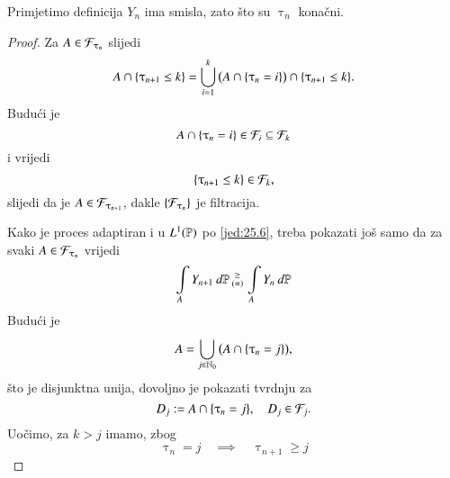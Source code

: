 \begin{nap} \label{nap:25.5-1}
    Primjetimo definicija $Y_n$ ima smisla, zato \v sto su $\uptau_n$ kona\v cni.
\end{nap}

\begin{proof}
    Za $A \in \mathcal{F}_{\uptau_n}$ slijedi
    \begin{equation*}
        A \cap \{ \uptau_{n + 1 } \leq k \} = \bigcup\limits_{i = 1}^{k} \big( A \cap \{ \uptau_n = i \} \big) \cap \{ \uptau_{n + 1} \leq k\}.
    \end{equation*}
    Budu\' ci je
    \begin{equation*}
        A \cap \{ \uptau_n = i \} \in \mathcal{F}_i \subseteq \mathcal{F}_k
    \end{equation*}
    i vrijedi
    \begin{equation*}
        \{ \uptau_{n + 1} \leq k \} \in \mathcal{F}_k,
    \end{equation*}
    slijedi da je $A \in \mathcal{F}_{\uptau_{n + 1}}$, dakle $\{\mathcal{F}_{\uptau_n}\}$ je filtracija.

    Kako je proces adaptiran i u $L^1 (\mathbb{P})$ po \eqref{jed:25.6}, treba pokazati jo\v s samo da za svaki $A \in \mathcal{F}_{\uptau_{n}}$ vrijedi
    \begin{equation*}
        \int\limits_A Y_{n + 1} \: d \mathbb{P}
        \begin{smallmatrix}
            \geq\\
            (=)
        \end{smallmatrix}
        \int\limits_A Y_n \: d \mathbb{P}
    \end{equation*}
    Budu\' ci je
    \begin{equation*}
        A = \bigcup\limits_{j \in \mathbb{N}_0}^{} \big( A \cap \{ \uptau_n = j \} \big),
    \end{equation*}
    \v sto je disjunktna unija, dovoljno je pokazati tvrdnju za
    \begin{equation*}
        D_j := A \cap \{ \uptau_n = j \}, \quad D_j \in \mathcal{F}_j.
    \end{equation*}
    Uo\v cimo, za $k > j$ imamo, zbog
    \begin{equation*}
        \uptau_n = j \quad \implies \quad \uptau_{n + 1} \geq j
    \end{equation*}


\end{proof}
